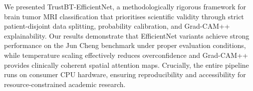 \documentclass[journal]{IEEEtran}
\begin{document}
We presented TrustBT-EfficientNet, a methodologically rigorous framework for brain tumor MRI
classification that prioritises scientific validity through strict patient-disjoint data splitting,
probability calibration, and Grad-CAM++ explainability. Our results demonstrate that EfficientNet
variants achieve strong performance on the Jun Cheng benchmark under proper evaluation conditions,
while temperature scaling effectively reduces overconfidence and Grad-CAM++ provides clinically
coherent spatial attention maps. Crucially, the entire pipeline runs on consumer CPU hardware,
ensuring reproducibility and accessibility for resource-constrained academic research.




\end{document}
